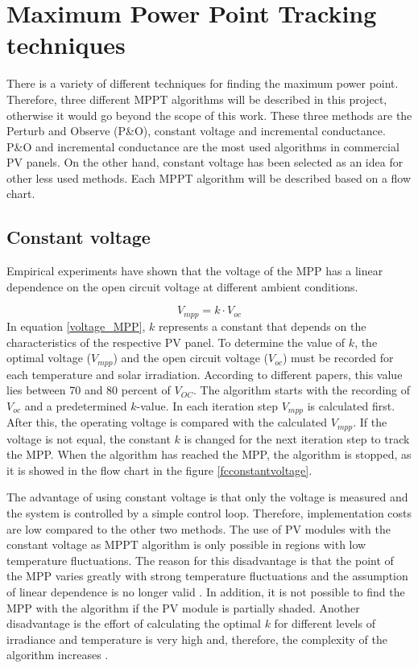 \section{Maximum Power Point Tracking techniques\label{MPPTalgo}}

There is a variety of different techniques for finding the maximum power point. Therefore, three different MPPT algorithms will be described in this project, otherwise it would go beyond the scope of this work. These three methods are the Perturb and Observe (P\&O), constant voltage and incremental conductance. P\&O and incremental conductance are the most used algorithms in commercial PV panels. On the other hand, constant voltage has been selected as an idea for other less used methods. Each MPPT algorithm will be described based on a flow chart. 

\subsection{Constant voltage}
Empirical experiments have shown that the voltage of the MPP has a linear dependence on the open circuit voltage at different ambient conditions\cite{flowchartVC}.

\begin{equation} \label{voltage_MPP}
V_{mpp} = k \cdot V_{oc}	
\end{equation} 
In equation \ref{voltage_MPP}, $k$ represents a constant that depends on the characteristics of the respective PV panel. To determine the value of $k$, the optimal voltage ($V_{mpp}$) and the open circuit voltage ($V_{oc}$) must be recorded for each temperature and solar irradiation. According to different papers, this value lies between 70 and 80 percent of $V_{OC}$\cite{MPPTResearch}. The algorithm starts with the recording of $V_{oc}$ and a predetermined $k$-value. In each iteration step $V_{mpp}$ is calculated first. After this, the operating voltage is compared with the calculated $V_{mpp}$. If the voltage is not equal, the constant $k$ is changed for the next iteration step to track the MPP. When the algorithm has reached the MPP, the algorithm is stopped, as it is showed in the flow chart in the figure \ref{fcconstantvoltage}. \cite{flowchartVC}

The advantage of using constant voltage is that only the voltage is measured and the system is controlled by a simple control loop. Therefore, implementation costs are low compared to the other two methods. The use of PV modules with the constant voltage as MPPT algorithm is only possible in regions with low temperature fluctuations. The reason for this disadvantage is that the point of the MPP varies greatly with strong temperature fluctuations and the assumption of linear dependence is no longer valid . In addition, it is not possible to find the MPP with the algorithm if the PV module is partially shaded. Another disadvantage is the effort of calculating the optimal $k$ for different levels of irradiance and temperature is very high and, therefore, the complexity of the algorithm increases \cite{flowchartVC}.

